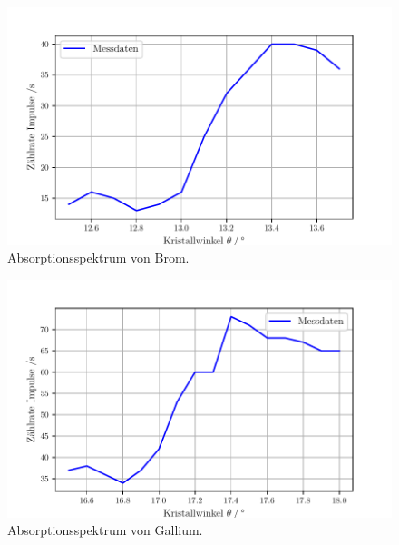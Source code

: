 \begin{figure}[H]
  \centering
  \includegraphics[width=\textwidth]{build/plot6.pdf}
  \caption{Absorptionsspektrum von Brom.}
  \label{fig:plot6}
\end{figure}

\begin{figure}[H]
  \centering
  \includegraphics[width=\textwidth]{build/plot7.pdf}
  \caption{Absorptionsspektrum von Gallium.}
  \label{fig:plot7}
\end{figure}



